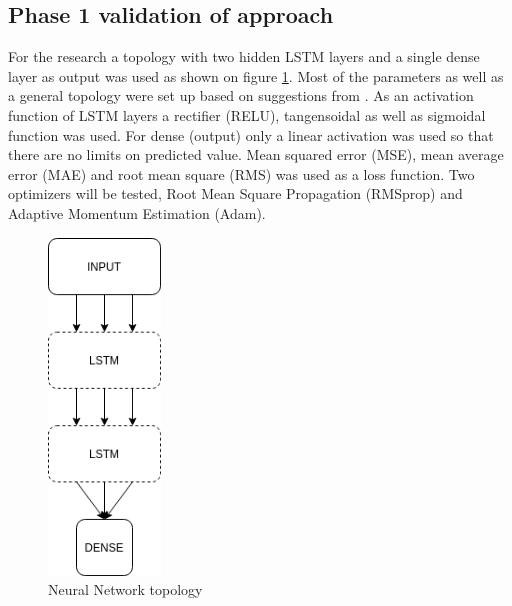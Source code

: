 \documentclass{kybernetika}
\begin{document}
\subsection{Phase 1 validation of approach}
For the research a topology with two hidden LSTM layers and a single dense layer as output was 
used as shown on figure \ref{fig:topology}.
Most of the parameters as well as a general topology were set up based on suggestions from 
\cite{Chollet2018}. As an activation function of LSTM layers a rectifier (RELU),
tangensoidal as well as sigmoidal function was used.
For dense (output) only a linear activation was used so that there are no limits on predicted 
value.
Mean squared error (MSE), mean average error (MAE) and root mean square (RMS)
was used as a loss function.
Two optimizers will be tested, Root Mean Square Propagation (RMSprop)\cite{Hinton2012} and 
Adaptive Momentum Estimation (Adam)\cite{Kingma2015}.
\begin{figure}[ht] 
	\centering
	\includegraphics[width=3cm]{figures/topology}
	\caption{Neural Network topology}
	\label{fig:topology}
\end{figure}
\end{document}
